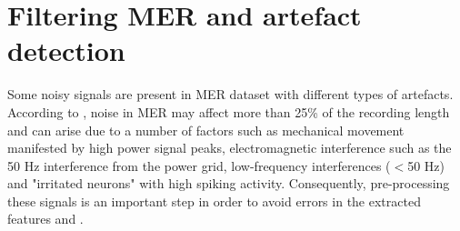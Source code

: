
\section{Filtering MER and artefact detection}
\label{sec:filtering}
Some noisy signals are present in MER dataset with different types of artefacts. According to , noise in MER may affect more than 25\% of the recording length and can arise due to a number of factors such as mechanical movement manifested by high power signal peaks, electromagnetic interference such as the 50 Hz interference from the power grid, low-frequency interferences ($<$50 Hz) and "irritated neurons" with high spiking activity. Consequently, pre-processing these signals is an important step in order to avoid errors in the extracted features and .

